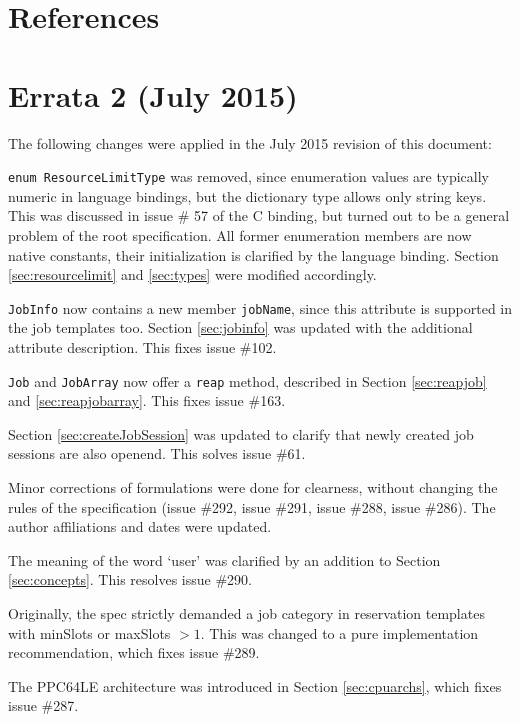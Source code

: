 \documentclass{article}
\newcommand{\h}[1]{\lstinline|#1|}
\begin{document}
\section{References}
\renewcommand{\refname}{}
\vspace*{-3em}


\newpage
\appendix

\section{Errata 2 (July 2015)}
\label{sec:errata}

The following changes were applied in the July 2015 revision of this document:

\lstinline{enum ResourceLimitType} was removed, since enumeration values are typically numeric in language bindings, but the dictionary type allows only string keys. This was discussed in issue \# 57 of the C binding, but turned out to be a general problem of the root specification. All former enumeration members are now native constants, their initialization is clarified by the language binding. Section \ref{sec:resourcelimit} and \ref{sec:types} were modified accordingly.

\h{JobInfo} now contains a new member \h{jobName}, since this attribute is supported in the job templates too. Section \ref{sec:jobinfo} was updated with the additional attribute description. This fixes issue \#102.

\h{Job} and \h{JobArray} now offer a \h{reap} method, described in Section \ref{sec:reapjob} and \ref{sec:reapjobarray}. This fixes issue \#163.

Section \ref{sec:createJobSession} was updated to clarify that newly created job sessions are also openend. This solves issue \#61.

Minor corrections of formulations were done for clearness, without changing the rules of the specification (issue \#292, issue \#291, issue \#288, issue \#286). The author affiliations and dates were updated.

The meaning of the word `user' was clarified by an addition to Section \ref{sec:concepts}. This resolves issue \#290.

Originally, the spec strictly demanded a job category in reservation templates with minSlots or maxSlots $> 1$. This was changed to a pure implementation recommendation, which fixes issue \#289.

The PPC64LE architecture was introduced in Section \ref{sec:cpuarchs}, which fixes issue \#287.
\end{document}

